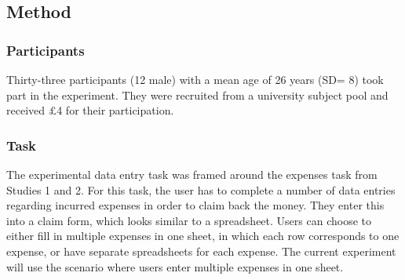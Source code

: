 

 
\subsection{Method}
\subsubsection{Participants}
Thirty-three participants (12 male) with a mean age of 26 years (SD= 8) took part in the experiment. They were recruited from a university subject pool and received $\pounds$4 for their participation.

\subsubsection{Task}
The experimental data entry task was framed around the expenses task from Studies 1 and 2. For this task, the user has to complete a number of data entries regarding incurred expenses in order to claim back the money. They enter this into a claim form, which looks similar to a spreadsheet. Users can choose to either fill in multiple expenses in one sheet, in which each row corresponds to one expense, or have separate spreadsheets for each expense. The current experiment will use the scenario where users enter multiple expenses in one sheet.

